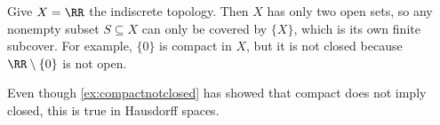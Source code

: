 \documentclass[../notes.tex]{subfiles}
\begin{document}
\begin{example} \label{ex:compactnotclosed}
	Give $X=\RR$ the indiscrete topology. Then $X$ has only two open sets, so any nonempty subset $S\subseteq X$ can only be covered by $\{X\}$, which is its own finite subcover. For example, $\{0\}$ is compact in $X$, but it is not closed because $\RR\setminus\{0\}$ is not open.
\end{example}
\begin{remark}
	Even though \autoref{ex:compactnotclosed} has showed that compact does not imply closed, this is true in Hausdorff spaces.
\end{remark}
\end{document}
